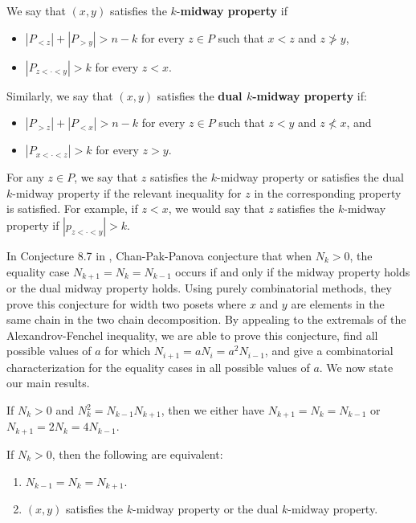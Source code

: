\documentclass{puthesis-UG}
\begin{document}
\begin{defn} \label{midway-defn}
	We say that $(x, y)$ satisfies the $k$-\textbf{midway property} if 
	\begin{itemize}
		\item $|P_{< z}| + |P_{>y}| > n-k$ for every $z \in P$ such that $x < z$ and $z \not > y$, 
		\item $|P_{z < \cdot < y}| > k$ for every $z < x$. 
	\end{itemize}
	Similarly, we say that $(x, y)$ satisfies the \textbf{dual $k$-midway property} if:
	\begin{itemize}
		\item $|P_{> z}| + |P_{<x}| > n-k$ for every $z \in P$ such that $z < y$ and $z \not < x$, and 
		\item $|P_{x < \cdot < z}| > k$ for every $z > y$. 
	\end{itemize}
	For any $z \in P$, we say that $z$ satisfies the $k$-midway property or satisfies the dual $k$-midway property if the relevant inequality for $z$ in the corresponding property is satisfied. For example, if $z < x$, we would say that $z$ satisfies the $k$-midway property if $|p_{z < \cdot < y}| > k$. 
\end{defn}

In Conjecture 8.7 in \cite{chan2022extensions}, Chan-Pak-Panova conjecture that when $N_k > 0$, the equality case $N_{k+1} = N_k = N_{k-1}$ occurs if and only if the midway property holds or the dual midway property holds. Using purely combinatorial methods, they prove this conjecture for width two posets where $x$ and $y$ are elements in the same chain in the two chain decomposition. By appealing to the extremals of the Alexandrov-Fenchel inequality, we are able to prove this conjecture, find all possible values of $a$ for which $N_{i+1} = aN_i = a^2 N_{i-1}$, and give a combinatorial characterization for the equality cases in all possible values of $a$. We now state our main results. 

\begin{thm} \label{kahn-saks-thm-1}
	If $N_k > 0$ and $N_k^2 = N_{k-1} N_{k+1}$, then we either have $N_{k+1} = N_k = N_{k-1}$ or $N_{k+1} = 2N_k = 4N_{k-1}$. 
\end{thm}

\begin{thm} \label{kahn-saks-thm-2}
	If $N_k > 0$, then the following are equivalent:
	\begin{enumerate}[label = (\alph*)]
		\item $N_{k-1} = N_k = N_{k+1}$.
		\item $(x, y)$ satisfies the $k$-midway property or the dual $k$-midway property. 
	\end{enumerate}
\end{thm}
\end{document}
